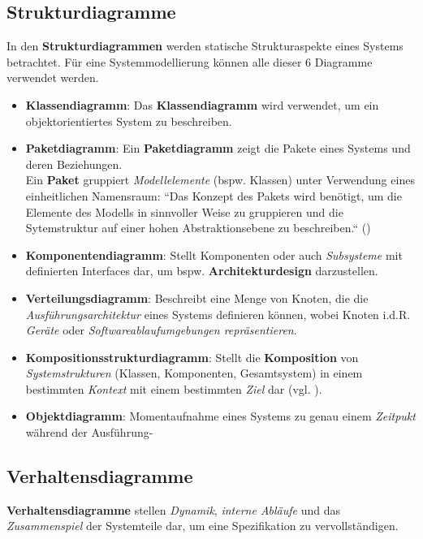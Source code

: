 \subsection{Strukturdiagramme}
In den \textbf{Strukturdiagrammen} werden statische Strukturaspekte eines Systems betrachtet.
Für eine Systemmodellierung können alle dieser 6 Diagramme verwendet werden.

\begin{itemize}
    \item \textbf{Klassendiagramm}: Das \textbf{Klassendiagramm} wird verwendet, um ein objektorientiertes System zu beschreiben.
    \item \textbf{Paketdiagramm}: Ein \textbf{Paketdiagramm} zeigt die Pakete eines Systems und deren Beziehungen.\\
    Ein \textbf{Paket} gruppiert \textit{Modellelemente} (bspw. Klassen) unter Verwendung eines einheitlichen Namensraum: ``Das Konzept des Pakets wird benötigt, um die Elemente des Modells in sinnvoller Weise zu gruppieren und die Sytemstruktur auf einer hohen Abstraktionsebene zu beschreiben.`` (\cite[55]{Bal05})
    \item \textbf{Komponentendiagramm}: Stellt Komponenten oder auch \textit{Subsysteme} mit definierten Interfaces dar, um bspw. \textbf{Architekturdesign} darzustellen.
    \item \textbf{Verteilungsdiagramm}: Beschreibt eine Menge von Knoten, die die \textit{Ausführungsarchitektur} eines Systems definieren können, wobei Knoten i.d.R. \textit{Geräte} oder \textit{Softwareablaufumgebungen repräsentieren}.
    \item \textbf{Kompositionsstrukturdiagramm}: Stellt die \textbf{Komposition} von \textit{Systemstrukturen} (Klassen, Komponenten, Gesamtsystem) in einem bestimmten \textit{Kontext} mit einem bestimmten \textit{Ziel} dar (vgl. \cite[9]{Buh09}).
    \item \textbf{Objektdiagramm}: Momentaufnahme eines Systems zu genau einem \textit{Zeitpukt} während der Ausführung-
\end{itemize}


\subsection{Verhaltensdiagramme}
\textbf{Verhaltensdiagramme} stellen \textit{Dynamik}, \textit{interne Abläufe} und das \textit{Zusammenspiel} der Systemteile dar, um eine Spezifikation zu vervollständigen.

